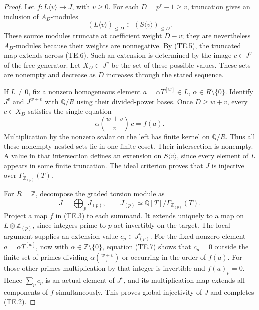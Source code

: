 \begin{proof}
Let \(f:L\langle v\rangle\to J\), with \(v\geq0\).
For each \(D=p^r-1\geq v\), truncation gives an inclusion of
\(A_D\)-modules
\[
 (L\langle v\rangle)_{\leq D}
      \subset (S\langle v\rangle)_{\leq D}.             \tag{TE.6}
\]
These source modules truncate at coefficient weight \(D-v\);
they are nevertheless \(A_D\)-modules because their weights are
nonnegative.  By (TE.5), the truncated map extends across (TE.6).
Such an extension is determined by the image
\(c\in J^v\) of the free generator.  Let \(X_D\subset J^v\)
be the set of these possible values.  These sets are nonempty
and decrease as \(D\) increases through the stated sequence.

If \(L\ne0\), fix a nonzero homogeneous element
\(a=\alpha T^{[w]}\in L\), \(\alpha\in R\setminus\{0\}\).
Identify \(J^v\) and \(J^{w+v}\) with \(\mathbb Q/R\)
using their divided-power bases.  Once \(D\geq w+v\), every
\(c\in X_D\) satisfies the single equation
\[
             \alpha\binom{w+v}{v}\,c=f(a).              \tag{TE.7}
\]
Multiplication by the nonzero scalar on the left has finite kernel
on \(\mathbb Q/R\).  Thus all these nonempty nested sets lie
in one finite coset.  Their intersection is nonempty.  A value
in that intersection defines an extension on
\(S\langle v\rangle\), since every element of \(L\) appears
in some finite truncation.  The ideal criterion proves that
\(J\) is injective over \(\Gamma_{\mathbb Z_{(p)}}(T)\).

For \(R=\mathbb Z\), decompose the graded torsion module as
\[
 J=\bigoplus_p J_{(p)},\qquad
 J_{(p)}\simeq\mathbb Q[T]/\Gamma_{\mathbb Z_{(p)}}(T).
                                                        \tag{TE.8}
\]
Project a map \(f\) in (TE.3) to each summand.  It extends
uniquely to a map on \(L\otimes\mathbb Z_{(p)}\), since
integers prime to \(p\) act invertibly on the target.  The local
argument supplies an extension value \(c_p\in J_{(p)}^v\).
For the fixed nonzero element \(a=\alpha T^{[w]}\), now with
\(\alpha\in\mathbb Z\setminus\{0\}\), equation (TE.7)
shows that \(c_p=0\) outside the finite set of primes dividing
\(\alpha\binom{w+v}{v}\) or occurring in the order of \(f(a)\).
For those other primes multiplication by that integer is invertible
and \(f(a)_p=0\).  Hence \(\sum_p c_p\) is an actual element
of \(J^v\), and its multiplication map extends all components of
\(f\) simultaneously.  This proves global injectivity of \(J\)
and completes (TE.2).
\end{proof}

